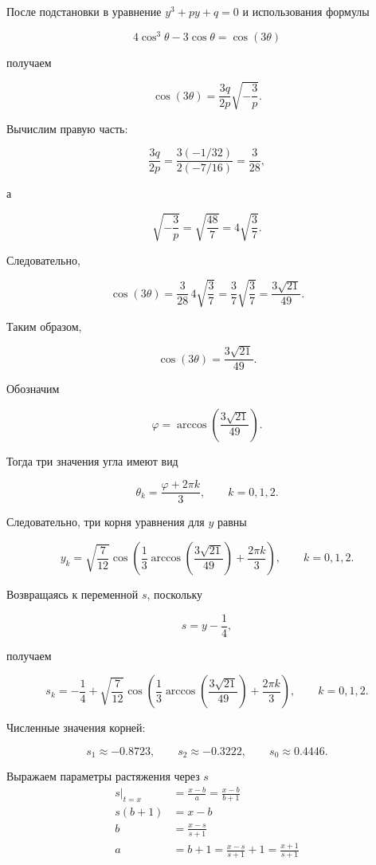 \documentclass[12pt,a4paper]{article}
\begin{document}
	После подстановки в уравнение $y^3+py+q=0$ и использования формулы
	
	$$
	4\cos^3\theta-3\cos\theta=\cos(3\theta)
	$$
	
	получаем
	
	$$
	\cos(3\theta)
	=
	\frac{3q}{2p}\sqrt{-\frac3p}.
	$$
	
	Вычислим правую часть:
	
	$$
	\frac{3q}{2p}
	=
	\frac{3(-1/32)}
	{2(-7/16)}
	=
	\frac3{28},
	$$
	
	а
	
	$$
	\sqrt{-\frac3p}
	=
	\sqrt{\frac{48}{7}}
	=
	4\sqrt{\frac37}.
	$$
	
	Следовательно,
	
	$$
	\cos(3\theta)
	=
	\frac3{28}\,4\sqrt{\frac37}
	=
	\frac3{7}\sqrt{\frac37}
	=
	\frac{3\sqrt{21}}{49}.
	$$
	
	Таким образом,
	
	$$
	\boxed{
		\cos(3\theta)=\frac{3\sqrt{21}}{49}.
	}
	$$
	
	Обозначим
	
	$$
	\varphi=
	\arccos\left(\frac{3\sqrt{21}}{49}\right).
	$$
	
	Тогда три значения угла имеют вид
	
	$$
	\theta_k=\frac{\varphi+2\pi k}{3},
	\qquad
	k=0,1,2.
	$$
	
	Следовательно, три корня уравнения для $y$ равны
	
	$$
	y_k=
	\sqrt{\frac7{12}}
	\cos\left(
	\frac13
	\arccos\left(\frac{3\sqrt{21}}{49}\right)
	+\frac{2\pi k}{3}
	\right),
	\qquad
	k=0,1,2.
	$$
	
	Возвращаясь к переменной $s$, поскольку
	
	$$
	s=y-\frac14,
	$$
	
	получаем
	
	$$
	\boxed{
		s_k=
		-\frac14+
		\sqrt{\frac7{12}}
		\cos\left(
		\frac13
		\arccos\left(\frac{3\sqrt{21}}{49}\right)
		+\frac{2\pi k}{3}
		\right),
		\qquad
		k=0,1,2.
	}
	$$
	
	Численные значения корней:
	
	$$
	\boxed{
		s_1 \approx -0.8723,
		\qquad
		s_2 \approx -0.3222,
		\qquad
		s_0 \approx 0.4446.
	}
	$$
	
	
	
	\noindent Выражаем параметры растяжения через $s$
	\begin{align*}
	s |_{t=x} &= \frac{x-b}{a} = \frac{x-b}{b+1}\\
	s (b+1) &= x-b\\
	b &= \frac{x-s}{s+1}\\
	a &= b + 1 = \frac{x-s}{s+1} + 1 = \frac{x+1}{s+1}
	\end{align*}
	
\end{document}
